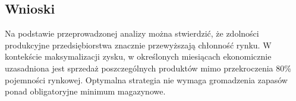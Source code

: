 \subsection{Wnioski}
Na podstawie przeprowadzonej analizy można stwierdzić, że zdolności produkcyjne przedsiębiorstwa znacznie przewyższają chłonność rynku. W kontekście 
maksymalizacji zysku, w określonych miesiącach ekonomicznie uzasadniona jest sprzedaż poszczególnych produktów mimo przekroczenia 80\% pojemności rynkowej. 
Optymalna strategia nie wymaga gromadzenia zapasów ponad obligatoryjne minimum magazynowe.

